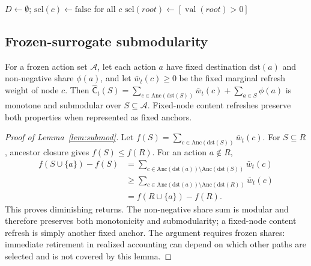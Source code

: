 \begin{algorithm}[tb]
\caption{$\textsc{OpenSet}(T_A,g,\bar w_t,\lambda)$}\label{alg:dp}
\SetAlgoLined
\DontPrintSemicolon
\footnotesize
{}
\BlankLine
{}
$D\gets\emptyset$; $\mathrm{sel}(c)\gets\mathrm{false}$ for all $c$\;
$\mathrm{sel}(\mathit{root})\gets[\operatorname{val}(\mathit{root})>0]$\;
\end{algorithm}

\subsection{Frozen-surrogate submodularity}\label{app:submod-proof}

\begin{lemma}\label{lem:submod}
For a frozen action set $\mathcal A$, let each action $a$ have fixed destination
$\mathrm{dst}(a)$ and non-negative share $\phi(a)$, and let
$\bar w_t(c)\ge0$ be the fixed marginal refresh weight of node $c$. Then
$\widehat{\mathsf C}_t(S)=\sum_{c\in\mathrm{Anc}(\mathrm{dst}(S))}\bar w_t(c)
+\sum_{a\in S}\phi(a)$ is monotone and submodular over $S\subseteq\mathcal A$.
Fixed-node content refreshes preserve both properties when represented as fixed
anchors.
\end{lemma}

\begin{proof}[Proof of Lemma~\ref{lem:submod}]
Let $f(S)=\sum_{c\in\mathrm{Anc}(\mathrm{dst}(S))}\bar w_t(c)$. For
$S\subseteq R$, ancestor closure gives $f(S)\le f(R)$. For an action
$a\notin R$,
\begin{align*}
f(S\cup\{a\})-f(S)
 &=\sum_{c\in\mathrm{Anc}(\mathrm{dst}(a))
          \setminus\mathrm{Anc}(\mathrm{dst}(S))}\bar w_t(c)\\
 &\ge\sum_{c\in\mathrm{Anc}(\mathrm{dst}(a))
          \setminus\mathrm{Anc}(\mathrm{dst}(R))}\bar w_t(c)\\
 &=f(R\cup\{a\})-f(R).
\end{align*}
This proves diminishing returns. The non-negative share sum is modular and
therefore preserves both monotonicity and submodularity; a fixed-node
content refresh is simply another fixed anchor. The argument requires frozen
shares: immediate retirement in realized accounting can depend on which other
paths are selected and is not covered by this lemma.
\end{proof}

